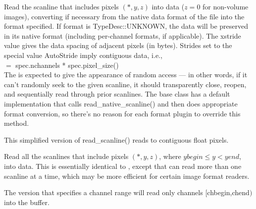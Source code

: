 Read the scanline that includes pixels $(*,y,z)$ into {\kw data}
($z=0$ for non-volume images),
converting if necessary from the native data format of the file into the
{\kw format} specified.
If {\cf format} is {\cf TypeDesc::UNKNOWN}, the data will be preserved 
in its native format (including per-channel formats, if applicable).
The {\kw xstride}
value gives the data spacing of adjacent pixels (in bytes).  Strides set
to the special value {\kw AutoStride} imply contiguous data, i.e., \\
   $=$ {\kw spec.nchannels * spec.pixel_size()} \\
The \ImageInput is expected to give the appearance of random access
--- in other words, if it can't randomly seek to the given scanline, it
should transparently close, reopen, and sequentially read through prior
scanlines.  The base \ImageInput class has a default implementation
that calls {\kw read_native_scanline()} and then does appropriate format
conversion, so there's no reason for each format plugin to override this
method.
\apiend

This simplified version of {\kw read_scanline()} reads to contiguous 
float pixels.
\apiend


Read all the scanlines that include pixels $(*,y,z)$, where
$\mathit{ybegin} \le y < \mathit{yend}$, into {\kw data}.  This is 
essentially identical to \readscanline, except that can read more than
one scanline at a time, which may be more efficient for certain image
format readers.

The version that specifies a channel range will read only
channels $[${\cf chbegin},{\cf chend}$)$ into the buffer.
\apiend


